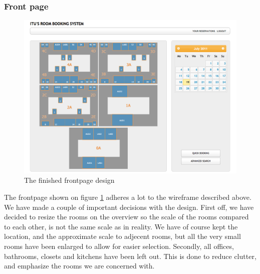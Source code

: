 \subsubsection*{Front page}
\begin{figure}[htb]
\begin{center}
\leavevmode
\includegraphics[width=1\textwidth]{images/frontpage}
\end{center}
\caption{The finished frontpage design}
\label{fig:frontpage}
\end{figure}
The frontpage shown on figure \ref{fig:frontpage} adheres a lot to the wireframe described above. 
We have made a couple of important decisions with the design. First off, we have decided to resize the rooms on the overview so the scale of the rooms compared to each other, is not the same scale as in reality. We have of course kept the location, and the approximate scale to adjecent rooms, but all the very small rooms have been enlarged to allow for easier selection.
Secondly, all offices, bathrooms, closets and kitchens have been left out. This is done to reduce clutter, and emphasize the rooms we are concerned with.

\pagebreak
